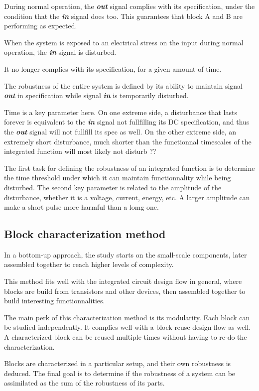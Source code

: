During normal operation, the \textbf{\textit{out}} signal complies with its specification,
under the condition that the \textbf{\textit{in}} signal does too.
This guarantees that block A and B are performing as expected.

When the system is exposed to an electrical stress on the input during normal operation,
the \textbf{\textit{in}} signal is disturbed.

It no longer complies with its specification, for a given amount of time.

The robustness of the entire system is defined by its ability to maintain signal \textbf{\textit{out}} in specification
while signal \textbf{\textit{in}} is temporarily disturbed.

Time is a key parameter here. On one extreme side, a disturbance that lasts forever is equivalent to the \textbf{\textit{in}} signal not fullfilling its DC specification,
and thus the \textbf{\textit{out}} signal will not fullfill its spec as well.
On the other extreme side, an extremely short disturbance, much shorter than the functionnal timescales of the integrated function will most likely not disturb ??

The first task for defining the robustness of an integrated function is to determine the time threshold under which it can maintain functionnality while being disturbed.
The second key parameter is related to the amplitude of the disturbance, whether it is a voltage, current, energy, etc.
A larger amplitude can make a short pulse more harmful than a lomg one.

\subsection{Block characterization method}

In a bottom-up approach, the study starts on the small-scale components,
later assembled together to reach higher levels of complexity.

This method fits well with the integrated circuit design flow in general,
where blocks are build from transistors and other devices, then assembled together to build interesting functionnalities.

The main perk of this characterization method is its modularity.
Each block can be studied independently.
It complies well with a block-reuse design flow as well.
A characterized block can be reused multiple times without having to re-do the characterization.

Blocks are characterized in a particular setup, and their own robustness is deduced. The final goal is to determine if the robustness of
a system can be assimilated as the sum of the robustness of its parts.

